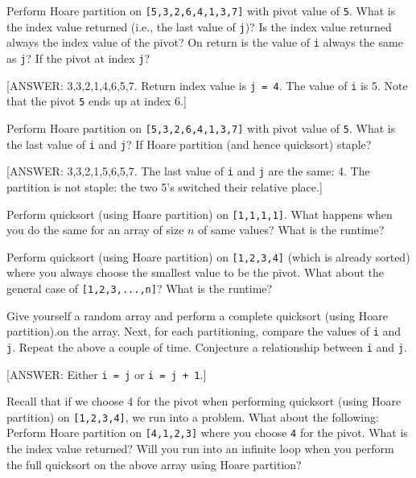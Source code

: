 \newpage
\begin{ex}
Perform Hoare partition on
\verb![5,3,2,6,4,1,3,7]! with pivot value of \verb!5!.
What is the index value returned (i.e., the last value of \verb!j!)?
Is the index value returned always the index value of the pivot?
On return is the value of \verb!i! always the same as \verb!j!?
If the pivot at index \verb!j!?
\end{ex}

[ANSWER: 3,3,2,1,4,6,5,7. Return index value is \verb!j = 4!.
The value of \verb!i! is 5.
Note that the pivot \verb!5! ends up at index 6.]

\newpage
\begin{ex}
Perform Hoare partition on \verb![5,3,2,6,4,1,3,7]! with pivot value of
\verb!5!.
What is the last value of \verb!i! and \verb!j!?
If Hoare partition (and hence quicksort) staple?
\end{ex}

[ANSWER: 3,3,2,1,5,6,5,7. The last value of \verb!i! and \verb!j!
are the same: 4.
The partition is not staple: the two 5's switched their
relative place.] 
  

\newpage
\begin{ex}
Perform quicksort (using Hoare partition) on
\verb![1,1,1,1]!.
What happens when you do the same for an array of size $n$ of same values?
What is the runtime?
\end{ex}


\newpage
\begin{ex}
Perform quicksort (using Hoare partition) on
\verb![1,2,3,4]! (which is already sorted)
where you always choose the smallest value to be the
pivot.
What about the general case of \verb![1,2,3,...,n]!?
What is the runtime?
\end{ex}

\newpage
\begin{ex}
Give yourself a random array and 
perform a complete quicksort (using Hoare partition).on the array.
Next, for each partitioning, compare the values of
\verb!i! and \verb!j!.
Repeat the above a couple of time.
Conjecture a relationship between \verb!i! and \verb!j!.
\end{ex}

[ANSWER: Either \verb!i = j! or \verb!i = j + 1!.]


\newpage
\begin{ex}
Recall that if we choose 4 for the pivot when performing
quicksort (using Hoare partition) on
\verb![1,2,3,4]!, we run into a problem.
What about the following:
Perform Hoare partition on \verb![4,1,2,3]! where you choose
\verb!4! for the pivot.
What is the index value returned?
Will you run into an infinite loop when you perform the full
quicksort on the above array using Hoare partition?
\end{ex}

